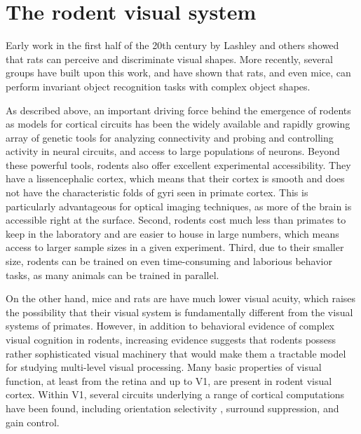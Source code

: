 \section{The rodent visual system}
Early work in the first half of the 20th century by Lashley and others showed that rats can perceive and discriminate visual shapes\cite{Lashley1912, Lashley1930a, Lashley1938}. More recently, several groups have built upon this work, and have shown that rats, and even mice, can perform invariant object recognition tasks with complex object shapes\cite{Zoccolan2009,Tafazoli2012,Vermaercke2012,Alemi-Neissi2013,Vinken2014,Djurdjevic2018, Froudarakis2020}.

As described above, an important driving force behind the emergence of rodents as models for cortical circuits has been the widely available and rapidly growing array of genetic tools for analyzing connectivity and probing and controlling activity in neural circuits\cite{Luo2008, Luo2018}, and access to large populations of neurons\cite{Sofroniew2016, Stringer2019geometry, Weisenburger2019,Stringer2021precision}. Beyond these powerful tools, rodents also offer excellent experimental accessibility. They have a lissencephalic cortex, which means that their cortex is smooth and does not have the characteristic folds of gyri seen in primate cortex. This is particularly advantageous for optical imaging techniques, as more of the brain is accessible right at the surface. Second, rodents cost much less than primates to keep in the laboratory and are easier to house in large numbers, which means access to larger sample sizes in a given experiment. Third, due to their smaller size, rodents can be trained on even time-consuming and laborious behavior tasks, as many animals can be trained in parallel.

On the other hand, mice and rats are have much lower visual acuity, which raises the possibility that their visual system is fundamentally different from the visual systems of primates. However, in addition to behavioral evidence of complex visual cognition in rodents, increasing evidence suggests that rodents possess rather sophisticated visual machinery that would make them a tractable model for studying multi-level visual processing. Many basic properties of visual function, at least from the retina and up to V1, are present in rodent visual cortex\cite{Huberman2011}. Within V1, several circuits underlying a range of cortical computations have been found, including orientation selectivity \cite{Ko2011, Lien2013}, surround suppression\cite{Adesnik2012}, and gain control\cite{Atallah2012}. 


